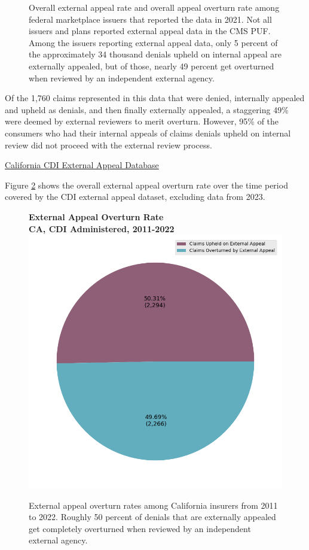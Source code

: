 \documentclass[12pt, a4paper,twoside,parskip=full]{report}
\theoremstyle{plain} %
\theoremstyle{definition} %
\theoremstyle{remark} %
\numberwithin{equation}{chapter}
\begin{document}
\begin{figure}[h!]
\begin{subfigure}[b]{0.49\textwidth}
			\end{subfigure}
			\caption{Overall external appeal rate and overall appeal overturn rate among federal marketplace issuers that reported the data in 2021. Not all issuers and plans reported external appeal data in the CMS PUF. Among the issuers reporting external appeal data, only 5 percent of the approximately 34 thousand denials upheld on internal appeal are externally appealed, but of those, nearly 49 percent get overturned when reviewed by an independent external agency.}
			\label{federalexternalappealpie}
		\end{figure}
		
		
		Of the 1,760 claims represented in this data that were denied, internally appealed and upheld as denials, and then finally externally appealed, a staggering 49\% were deemed by external reviewers to merit overturn. However, 95\% of the consumers who had their internal appeals of claims denials upheld on internal review did not proceed with the external review process.
		
		\underline{California CDI External Appeal Database}
		
		Figure \ref{cacdiexternalappealpie} shows the overall external appeal overturn rate over the time period covered by the CDI external appeal dataset, excluding data from 2023.
		
		
		\begin{figure}[h!]
			\centering
			\textbf{External Appeal Overturn Rate}\\
			\textbf{CA, CDI Administered, 2011-2022}\\
			\includegraphics[width=.4\textwidth]{images/ca_doi_external_appeals/external_appeal_success_rates.png}
			\caption{External appeal overturn rates among California insurers from 2011 to 2022. Roughly 50 percent of denials that are externally appealed get completely overturned when reviewed by an independent external agency.}
			\label{cacdiexternalappealpie}
		\end{figure}
	
\end{document}
